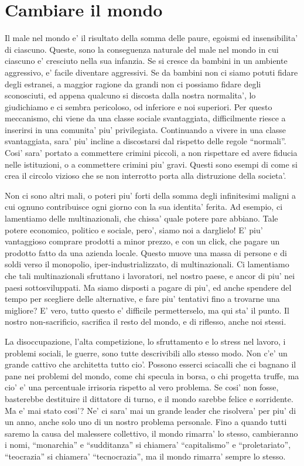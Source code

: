\chapter{Cambiare il mondo}

Il male nel mondo e' il risultato della somma delle paure, egoismi ed insensibilita' di ciascuno. Queste, sono la conseguenza naturale del male nel mondo in cui ciascuno e' cresciuto nella sua infanzia. Se si cresce da bambini in un ambiente aggressivo, e' facile diventare aggressivi. Se da bambini non ci siamo potuti fidare degli estranei, a maggior ragione da grandi non ci possiamo fidare degli sconosciuti, ed appena qualcuno si discosta dalla nostra normalita', lo giudichiamo e ci sembra pericoloso, od inferiore e noi superiori. Per questo meccanismo, chi viene da una classe sociale svantaggiata, difficilmente riesce a inserirsi in una comunita' piu' privilegiata. Continuando a vivere in una classe svantaggiata, sara' piu' incline a discostarsi dal rispetto delle regole ``normali''. Cosi' sara' portato a commettere crimini piccoli, a non rispettare ed avere fiducia nelle istituzioni, o a commettere crimini piu' gravi. Questi sono esempi di come si crea il circolo vizioso che se non interrotto porta alla distruzione della societa'.

Non ci sono altri mali, o poteri piu' forti della somma degli infinitesimi maligni a cui ognuno contribuisce ogni giorno con la sua identita' ferita. Ad esempio, ci lamentiamo delle multinazionali, che chissa' quale potere pare abbiano. Tale potere economico, politico e sociale, pero', siamo noi a darglielo! E' piu' vantaggioso comprare prodotti a minor prezzo, e con un click, che pagare un prodotto fatto da una azienda locale. Questo muove una massa di persone e di soldi verso il monopolio, iper-industrializzato, di multinazionali. Ci lamentiamo che tali multinazionali sfruttano i lavoratori, nel nostro paese, e ancor di piu' nei paesi sottosviluppati. Ma siamo disposti a pagare di piu', ed anche spendere del tempo per scegliere delle alternative, e fare piu' tentativi fino a trovarne una migliore? E' vero, tutto questo e' difficile permetterselo, ma qui sta' il punto. Il nostro non-sacrificio, sacrifica il resto del mondo, e di riflesso, anche noi stessi.

La disoccupazione, l'alta competizione, lo sfruttamento e lo stress nel lavoro, i problemi sociali, le guerre, sono tutte descrivibili allo stesso modo. Non c'e' un grande cattivo che architetta tutto cio'. Possono esserci sciacalli che ci bagnano il pane nei problemi del mondo, come chi specula in borsa, o chi progetta truffe, ma cio' e' una percentuale irrisoria rispetto al vero problema. Se cosi' non fosse, basterebbe destituire il dittatore di turno, e il mondo sarebbe felice e sorridente. Ma e' mai stato cosi'? Ne' ci sara' mai un grande leader che risolvera' per piu' di un anno, anche solo uno di un nostro problema personale. Fino a quando tutti saremo la causa del malessere collettivo, il mondo rimarra' lo stesso, cambieranno i nomi, ``monarchia'' e ``sudditanza'' si chiamera' ``capitalismo'' e ``proletariato'', ``teocrazia'' si chiamera' ``tecnocrazia'', ma il mondo rimarra' sempre lo stesso.


